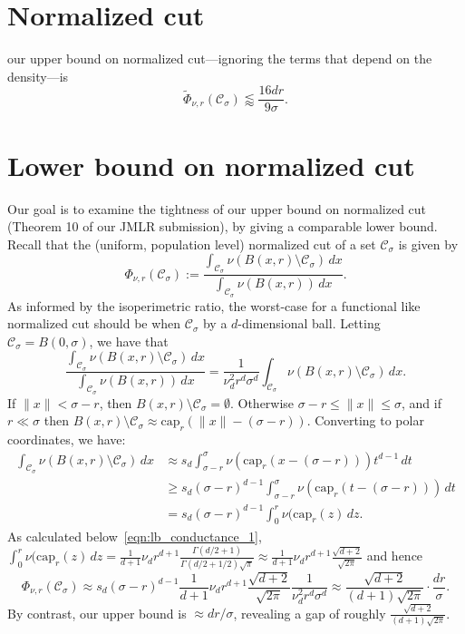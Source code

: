\documentclass{article}
\newcommand{\1}{\mathbf{1}}
\newcommand{\mc}[1]{\mathcal{#1}}
\newcommand{\wt}[1]{\widetilde{#1}}
\theoremstyle{definition}
\theoremstyle{remark}
\begin{document}
\section{Normalized cut}
our upper bound on normalized cut---ignoring the terms that depend on the density---is 
\begin{equation*}
\wt{\Phi}_{\nu,r}(\mc{C}_{\sigma}) \lessapprox \frac{16dr}{9\sigma}.
\end{equation*}
\section{Lower bound on normalized cut}
Our goal is to examine the tightness of our upper bound on normalized cut (Theorem 10 of our JMLR submission), by giving a comparable lower bound. Recall that the (uniform, population level) normalized cut of a set $\mc{C}_{\sigma}$ is given by
\begin{equation*}
\Phi_{\nu,r}(\mc{C}_{\sigma}) := \frac{\int_{\mc{C}_{\sigma}} \nu(B(x,r) \setminus \mc{C}_{\sigma}) \,dx}{\int_{\mc{C}_{\sigma}} \nu(B(x,r)) \,dx}.
\end{equation*}
As informed by the isoperimetric ratio, the worst-case for a functional like normalized cut should be when $\mc{C}_{\sigma}$ by a $d$-dimensional ball. Letting $\mc{C}_{\sigma} = B(0,\sigma)$, we have that
\begin{equation*}
\frac{\int_{\mc{C}_{\sigma}} \nu(B(x,r) \setminus \mc{C}_{\sigma}) \,dx}{\int_{\mc{C}_{\sigma}} \nu(B(x,r)) \,dx} = \frac{1}{\nu_d^2 r^d \sigma^d} \int_{\mc{C}_{\sigma}} \nu(B(x,r) \setminus \mc{C}_{\sigma}) \,dx.
\end{equation*}
If $\|x\| < \sigma - r$, then $B(x,r) \setminus \mc{C}_{\sigma} = \emptyset$. Otherwise $\sigma - r \leq \|x\| \leq \sigma$, and if $r \ll \sigma$ then $B(x,r) \setminus \mc{C}_{\sigma} \approx \mathrm{cap}_{r}(\|x\| - (\sigma - r))$. Converting to polar coordinates, we have:
\begin{align*}
\int_{\mc{C}_{\sigma}} \nu(B(x,r) \setminus \mc{C}_{\sigma}) \,dx & \approx s_d \int_{\sigma - r}^{\sigma} \nu(\mathrm{cap}_{r}(x - (\sigma - r))) t^{d - 1} \,dt \\
& \geq s_d (\sigma - r)^{d - 1} \int_{\sigma - r}^{\sigma} \nu(\mathrm{cap}_{r}(t - (\sigma - r)))  \,dt \\
& = s_d (\sigma - r)^{d - 1} \int_{0}^{r} \nu(\mathrm{cap}_{r}(z)  \,dz.
\end{align*}
As calculated below~\eqref{eqn:lb_conductance_1}, $\int_{0}^{r} \nu(\mathrm{cap}_{r}(z)  \,dz = \frac{1}{d + 1} \nu_d r^{d + 1} \frac{\Gamma(d/2 + 1)}{\Gamma(d/2 + 1/2)\sqrt{\pi}} \approx \frac{1}{d + 1} \nu_d r^{d + 1} \frac{\sqrt{d + 2}}{\sqrt{2\pi}}$ and hence
\begin{equation*}
\Phi_{\nu,r}(\mc{C}_{\sigma}) \approx s_d (\sigma - r)^{d - 1}\frac{1}{d + 1} \nu_d r^{d + 1} \frac{\sqrt{d + 2}}{\sqrt{2\pi}} \frac{1}{\nu_d^2 r^d \sigma^d} \approx \frac{ \sqrt{d + 2}}{(d + 1)\sqrt{2\pi}} \cdot \frac{dr}{\sigma}.
\end{equation*}
By contrast, our upper bound is $\approx dr/\sigma$, revealing a gap of roughly $\frac{ \sqrt{d + 2}}{(d + 1)\sqrt{2\pi}}$. 
\end{document}

